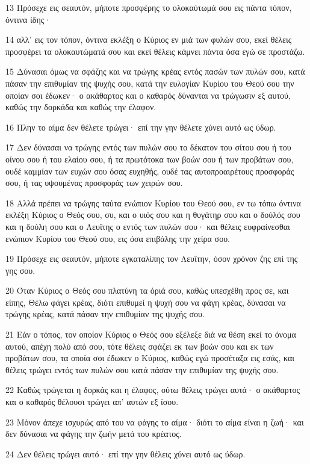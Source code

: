 \par 13 Πρόσεχε εις σεαυτόν, μήποτε προσφέρης το ολοκαύτωμά σου εις πάντα τόπον, όντινα ίδης·
\par 14 αλλ' εις τον τόπον, όντινα εκλέξη ο Κύριος εν μιά των φυλών σου, εκεί θέλεις προσφέρει τα ολοκαυτώματά σου και εκεί θέλεις κάμνει πάντα όσα εγώ σε προστάζω.
\par 15 Δύνασαι όμως να σφάζης και να τρώγης κρέας εντός πασών των πυλών σου, κατά πάσαν την επιθυμίαν της ψυχής σου, κατά την ευλογίαν Κυρίου του Θεού σου την οποίαν σοι έδωκεν· ο ακάθαρτος και ο καθαρός δύνανται να τρώγωσιν εξ αυτού, καθώς την δορκάδα και καθώς την έλαφον.
\par 16 Πλην το αίμα δεν θέλετε τρώγει· επί την γην θέλετε χύνει αυτό ως ύδωρ.
\par 17 Δεν δύνασαι να τρώγης εντός των πυλών σου το δέκατον του σίτου σου ή του οίνου σου ή του ελαίου σου, ή τα πρωτότοκα των βοών σου ή των προβάτων σου, ουδέ καμμίαν των ευχών σου όσας ευχηθής, ουδέ τας αυτοπροαιρέτους προσφοράς σου, ή τας υψουμένας προσφοράς των χειρών σου.
\par 18 Αλλά πρέπει να τρώγης ταύτα ενώπιον Κυρίου του Θεού σου, εν τω τόπω όντινα εκλέξη Κύριος ο Θεός σου, συ, και ο υιός σου και η θυγάτηρ σου και ο δούλός σου και η δούλη σου και ο Λευΐτης ο εντός των πυλών σου· και θέλεις ευφραίνεσθαι ενώπιον Κυρίου του Θεού σου, εις όσα επιβάλης την χείρα σου.
\par 19 Πρόσεχε εις σεαυτόν, μήποτε εγκαταλίπης τον Λευΐτην, όσον χρόνον ζης επί της γης σου.
\par 20 Όταν Κύριος ο Θεός σου πλατύνη τα όριά σου, καθώς υπεσχέθη προς σε, και είπης, Θέλω φάγει κρέας, διότι επιθυμεί η ψυχή σου να φάγη κρέας, δύνασαι να τρώγης κρέας, κατά πάσαν την επιθυμίαν της ψυχής σου.
\par 21 Εάν ο τόπος, τον οποίον Κύριος ο Θεός σου εξέλεξε διά να θέση εκεί το όνομα αυτού, απέχη πολύ από σου, τότε θέλεις σφάζει εκ των βοών σου και εκ των προβάτων σου, τα οποία σοι έδωκεν ο Κύριος, καθώς εγώ προσέταξα εις εσάς, και θέλεις τρώγει εντός των πυλών σου κατά πάσαν την επιθυμίαν της ψυχής σου.
\par 22 Καθώς τρώγεται η δορκάς και η έλαφος, ούτω θέλεις τρώγει αυτά· ο ακάθαρτος και ο καθαρός θέλουσι τρώγει απ' αυτών εξ ίσου.
\par 23 Μόνον άπεχε ισχυρώς από του να φάγης το αίμα· διότι το αίμα είναι η ζωή· και δεν δύνασαι να φάγης την ζωήν μετά του κρέατος.
\par 24 Δεν θέλεις τρώγει αυτό· επί την γην θέλεις χύνει αυτό ως ύδωρ.
